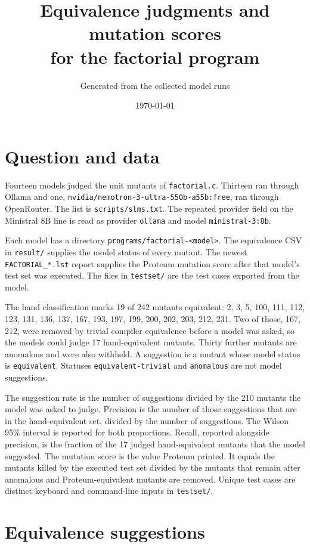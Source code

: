 \documentclass[11pt]{article}
\title{Equivalence judgments and mutation scores\\for the factorial program}
\author{Generated from the collected model runs}
\date{\today}
\begin{document}
\sloppy
\maketitle

\section{Question and data}

Fourteen models judged the unit mutants of \texttt{factorial.c}. Thirteen ran through Ollama and one, \texttt{nvidia/nemotron-3-ultra-550b-a55b:free}, ran through OpenRouter. The list is \texttt{scripts/slms.txt}. The repeated provider field on the Ministral 8B line is read as provider \texttt{ollama} and model \texttt{ministral-3:8b}.

Each model has a directory \texttt{programs/factorial-<model>}. The equivalence CSV in \texttt{result/} supplies the model status of every mutant. The newest \texttt{FACTORIAL\_*.lst} report supplies the Proteum mutation score after that model's test set was executed. The files in \texttt{testset/} are the test cases exported from the model.

The hand classification marks 19 of 242 mutants equivalent: 2, 3, 5, 100, 111, 112, 123, 131, 136, 137, 167, 193, 197, 199, 200, 202, 203, 212, 231. Two of those, 167, 212, were removed by trivial compiler equivalence before a model was asked, so the models could judge 17 hand-equivalent mutants. Thirty further mutants are anomalous and were also withheld. A suggestion is a mutant whose model status is \texttt{equivalent}. Statuses \texttt{equivalent-trivial} and \texttt{anomalous} are not model suggestions.

The suggestion rate is the number of suggestions divided by the 210 mutants the model was asked to judge. Precision is the number of those suggestions that are in the hand-equivalent set, divided by the number of suggestions. The Wilson 95\% interval is reported for both proportions. Recall, reported alongside precision, is the fraction of the 17 judged hand-equivalent mutants that the model suggested. The mutation score is the value Proteum printed. It equals the mutants killed by the executed test set divided by the mutants that remain after anomalous and Proteum-equivalent mutants are removed. Unique test cases are distinct keyboard and command-line inputs in \texttt{testset/}.

\section{Equivalence suggestions}
\end{document}
